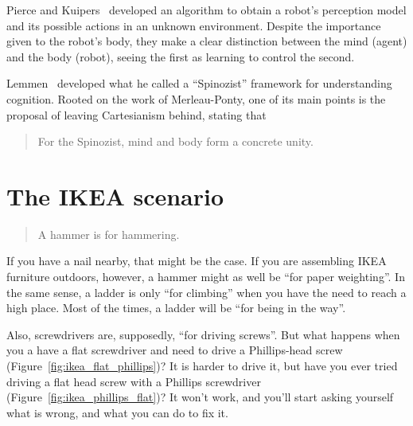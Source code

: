 \documentclass{article}
\begin{document}
Pierce and Kuipers~\cite{pierce1997} developed an algorithm to obtain a robot's
perception model and its possible actions in an unknown environment. Despite the
importance given to the robot's body, they make a clear distinction between the
mind (agent) and the body (robot), seeing the first as learning to control the
second.


Lemmen~\cite{lemmen1997} developed what he called a ``Spinozist'' framework for
understanding cognition. Rooted on the work of Merleau-Ponty, one of its main
points is the proposal of leaving Cartesianism behind, stating that

\begin{quotation}
  For the Spinozist, mind and body form a concrete unity.
\end{quotation}


\section{The IKEA scenario}

\begin{quotation}
  A hammer is for hammering.
\end{quotation}

If you have a nail nearby, that might be the case. If you are assembling IKEA
furniture outdoors, however, a hammer might as well be ``for paper weighting''.
In the same sense, a ladder is only ``for climbing'' when you have the need to
reach a high place. Most of the times, a ladder will be
``for being in the way''.

Also, screwdrivers are, supposedly, ``for driving screws''. But what happens
when you a have a flat screwdriver and need to drive a Phillips-head screw
(Figure~\ref{fig:ikea_flat_phillips})? It is harder to drive it, but have you
ever tried driving a flat head screw with a Phillips screwdriver
(Figure~\ref{fig:ikea_phillips_flat})? It won't work, and you'll start asking
yourself what is wrong, and what you can do to fix it.
\end{document}
